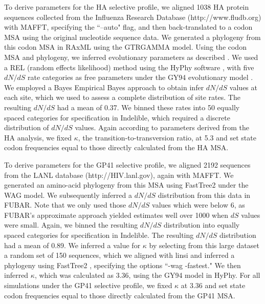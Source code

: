 \documentclass[11pt]{article}
\begin{document}
To derive parameters for the HA selective profile, we aligned 1038 HA protein sequences collected from the Influenza Research Database (http://www.fludb.org) with MAFFT, specifying the ``--auto" flag, \citep{Katoh2002,Katoh2005} and then back-translated to a codon MSA using the original nucleotide sequence data. We generated a phylogeny from this codon MSA in RAxML \citep{Stamatakis2006} using the GTRGAMMA model. Using the codon MSA and phylogeny, we inferred evolutionary parameters as described \citep{Spielman2013}. We used a REL (random effects likelihood) method \citep{NielsenYang1998} using the HyPhy software \citep{Pond2005}, with five $dN/dS$ rate categories as free parameters under the GY94 evolutionary model \citep{GoldmanYang1994}. We employed a Bayes Empirical Bayes approach \citep{Yang2000} to obtain infer $dN/dS$ values at each site, which we used to assess a complete distribution of site rates. The resulting $dN/dS$ had a mean of 0.37. We binned these rates into 50 equally spaced categories for specification in Indelible, which required a discrete distribution of $dN/dS$ values. Again according to parameters derived from the HA analysis, we fixed $\kappa$, the transition-to-transversion ratio, at 5.3 and set state codon frequencies equal to those directly calculated from the HA MSA. 

To derive parameters for the GP41 selective profile, we aligned 2192 sequences from the LANL database (http://HIV.lanl.gov), again with MAFFT. We generated an amino-acid phylogeny from this MSA using FastTree2 under the WAG model. We subsequently inferred a $dN/dS$ distribution from this data in FUBAR. Note that we only used those $dN/dS$ values which were below 6, as FUBAR's approximate approach yielded estimates well over 1000 when $dS$ values were small. Again, we binned the resulting $dN/dS$ distribution into equally spaced categories for specification in Indelible. The resulting $dN/dS$ distribution had a mean of 0.89. We inferred a value for $\kappa$ by selecting from this large dataset a random set of 150 sequences, which we aligned with linsi \citep{Katoh2002,Katoh2005} and inferred a phylogeny using FastTree2 \citep{Price2010}, specifying the options ``-wag -fastest." We then inferred $\kappa$, which was calculated as 3.36, using the GY94 model in HyPhy. For all simulations under the GP41 selective profile, we fixed $\kappa$ at 3.36 and set state codon frequencies equal to those directly calculated from the GP41 MSA. 
\end{document}
